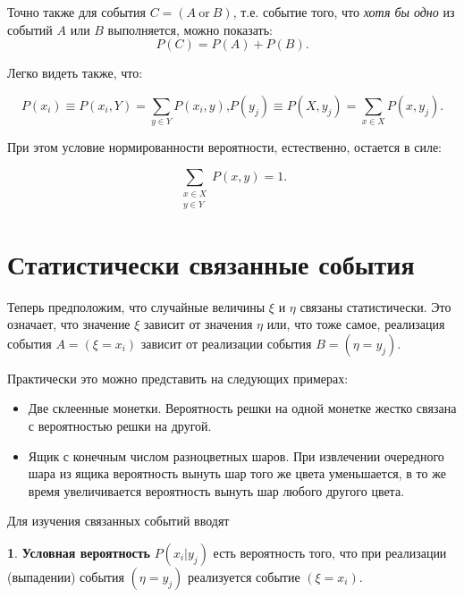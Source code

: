 \documentclass[12pt,a4paper,openright]{book}
\theoremstyle{definition}
\newtheorem{definition}{\textls[150]{Определение}}[chapter]
\numberwithin{equation}{chapter}
\begin{document}
\begin{appendices}
		Точно также для события $C = (A \ \mathrm{or} \ B)$, т.е. событие того, что \textit{хотя бы одно} из событий $A$ или $B$ выполняется, можно показать:
		\begin{equation}
			P(C) = P(A) + P(B) \text{.}
		\end{equation}

		Легко видеть также, что:

		\begin{subequations}\label{f:pr-twoarg-sum-by-arg}
			\begin{equation}
				P(x_i) \equiv P(x_i, Y) = \sum\limits_{y \in Y} P(x_i, y) \text{,}
			\end{equation}
			\begin{equation}
				P(y_j) \equiv P(X, y_j) = \sum\limits_{x \in X} P(x, y_j) \text{.}
			\end{equation}
		\end{subequations}

		При этом условие нормированности вероятности, естественно, остается в силе:

		$$ \sum\limits_{\substack{x \in X \\ y \in Y}} P(x, y) = 1 \text{.}$$

		\section{Статистически связанные события}

		Теперь предположим, что случайные величины $\xi$ и $\eta$ связаны статистически. Это означает, что значение $\xi$ зависит от значения $\eta$ или, что тоже самое, реализация события $A = (\xi = x_i)$ зависит от реализации события $B = (\eta = y_j)$.

		Практически это можно представить на следующих примерах:
		\begin{itemize}
			\item Две склеенные монетки. Вероятность решки на одной монетке жестко связана с вероятностью решки на другой.
			\item Ящик с конечным числом разноцветных шаров. При извлечении очередного шара из ящика вероятность вынуть шар того же цвета уменьшается, в то же время увеличивается вероятность вынуть шар любого другого цвета.
		\end{itemize}

		Для изучения связанных событий вводят
		\begin{definition}
			\textbf{Условная вероятность} $P(x_i | y_j)$ есть вероятность того, что при реализации (выпадении) события $(\eta = y_j)$ реализуется событие $(\xi = x_i)$.
		\end{definition}


\end{appendices}
\end{document}
